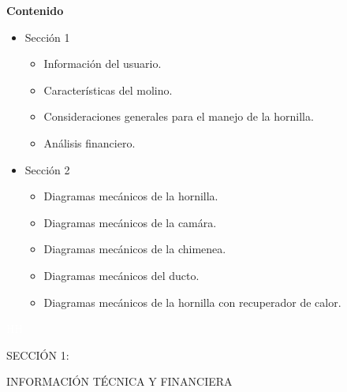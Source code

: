 \documentclass{article}%
\begin{document}
\newpage%
\begin{large}%
\begin{Large}%
\textbf{Contenido}%
\end{Large}%
\begin{itemize}%
\item%
Sección 1%
\begin{itemize}%
\item%
Información del usuario.%
\item%
Características del molino.%
\item%
Consideraciones generales para el manejo de la hornilla.%
\item%
Análisis financiero.%
\end{itemize}%
\item%
Sección 2%
\begin{itemize}%
\item%
Diagramas mecánicos de la hornilla.%
\item%
Diagramas mecánicos de la camára.%
\item%
Diagramas mecánicos de la chimenea.%
\item%
Diagramas mecánicos del ducto.%
\item%
Diagramas mecánicos de la hornilla con recuperador de calor.%
\end{itemize}%
\end{itemize}%
\end{large}%
\newpage%
\begin{center}%
\textcolor{white}{ 
HH
}%
\linebreak%
\linebreak%
\linebreak%
\linebreak%
\linebreak%
\linebreak%
\linebreak%
\linebreak%
\linebreak%
\linebreak%
\linebreak%
\linebreak%
\linebreak%
\linebreak%
\linebreak%
\begin{Huge}%
SECCIÓN 1:%
\end{Huge}%
\linebreak%
\begin{Huge}%
INFORMACIÓN TÉCNICA Y FINANCIERA%
\end{Huge}%
\end{center}%
\end{document}
